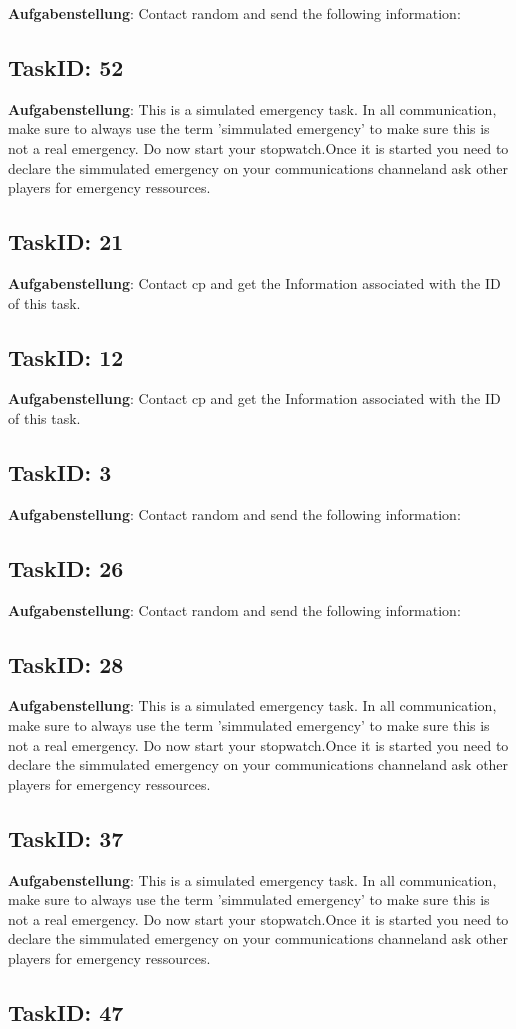 \documentclass[12pt,a4paper]{scrreprt}
\begin{document}
\textbf{Aufgabenstellung}: Contact random and send the following information: \subsection{TaskID: 52}
\textbf{Aufgabenstellung}: This is a simulated emergency task. In all communication, make sure to always use the term 'simmulated emergency' to make sure this is not a real emergency. Do now start your stopwatch.Once it is started you need to declare the simmulated emergency on your communications channeland ask other players for emergency ressources.\subsection{TaskID: 21}
\textbf{Aufgabenstellung}: Contact {cp} and get the Information associated with the ID of this task.\subsection{TaskID: 12}
\textbf{Aufgabenstellung}: Contact {cp} and get the Information associated with the ID of this task.\subsection{TaskID: 3}
\textbf{Aufgabenstellung}: Contact random and send the following information: \subsection{TaskID: 26}
\textbf{Aufgabenstellung}: Contact random and send the following information: \subsection{TaskID: 28}
\textbf{Aufgabenstellung}: This is a simulated emergency task. In all communication, make sure to always use the term 'simmulated emergency' to make sure this is not a real emergency. Do now start your stopwatch.Once it is started you need to declare the simmulated emergency on your communications channeland ask other players for emergency ressources.\subsection{TaskID: 37}
\textbf{Aufgabenstellung}: This is a simulated emergency task. In all communication, make sure to always use the term 'simmulated emergency' to make sure this is not a real emergency. Do now start your stopwatch.Once it is started you need to declare the simmulated emergency on your communications channeland ask other players for emergency ressources.\subsection{TaskID: 47}
\end{document}
